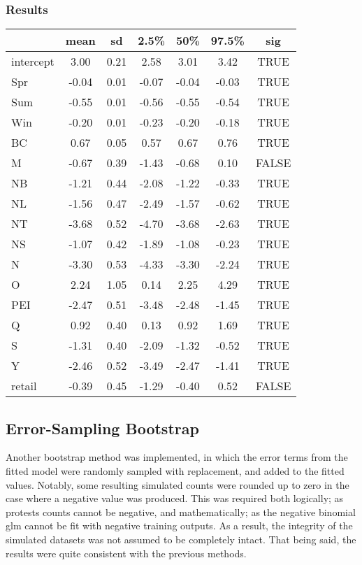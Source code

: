 \documentclass[12pt]{article}
\begin{document}
\subsubsection*{Results}
\begin{table}[hbt!]
    \centering
    \begin{tabular}{|l|c|c|c|c|c|c|}
      \hline
     & mean & sd & 2.5\% & 50\% & 97.5\% & sig \\ 
      \hline
    intercept & 3.00 & 0.21 & 2.58 & 3.01 & 3.42 & TRUE \\ 
      Spr & -0.04 & 0.01 & -0.07 & -0.04 & -0.03 & TRUE \\ 
      Sum & -0.55 & 0.01 & -0.56 & -0.55 & -0.54 & TRUE \\ 
      Win & -0.20 & 0.01 & -0.23 & -0.20 & -0.18 & TRUE \\ 
      BC & 0.67 & 0.05 & 0.57 & 0.67 & 0.76 & TRUE \\ 
      M & -0.67 & 0.39 & -1.43 & -0.68 & 0.10 & FALSE \\ 
      NB & -1.21 & 0.44 & -2.08 & -1.22 & -0.33 & TRUE \\ 
      NL & -1.56 & 0.47 & -2.49 & -1.57 & -0.62 & TRUE \\ 
      NT & -3.68 & 0.52 & -4.70 & -3.68 & -2.63 & TRUE \\ 
      NS & -1.07 & 0.42 & -1.89 & -1.08 & -0.23 & TRUE \\ 
      N & -3.30 & 0.53 & -4.33 & -3.30 & -2.24 & TRUE \\ 
      O & 2.24 & 1.05 & 0.14 & 2.25 & 4.29 & TRUE \\ 
      PEI & -2.47 & 0.51 & -3.48 & -2.48 & -1.45 & TRUE \\ 
      Q & 0.92 & 0.40 & 0.13 & 0.92 & 1.69 & TRUE \\ 
      S & -1.31 & 0.40 & -2.09 & -1.32 & -0.52 & TRUE \\ 
      Y & -2.46 & 0.52 & -3.49 & -2.47 & -1.41 & TRUE \\ 
      retail & -0.39 & 0.45 & -1.29 & -0.40 & 0.52 & FALSE \\ 
       \hline
    \end{tabular}
\end{table}
    

\subsection{Error-Sampling Bootstrap}
Another bootstrap method was implemented, in which the error terms from the fitted model were randomly sampled with replacement, and added to the fitted values. Notably, some resulting simulated counts were rounded up to zero in the case where a negative value was produced. This was required both logically; as protests counts cannot be negative, and mathematically; as the negative binomial glm cannot be fit with negative training outputs. As a result, the integrity of the simulated datasets was not assumed to be completely intact. That being said, the results were quite consistent with the previous methods.
\end{document}
